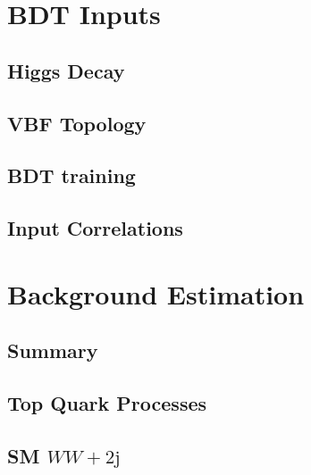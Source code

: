 

\section{BDT Inputs}

\subsection{Higgs Decay}

\subsection{VBF Topology}

\subsection{BDT training}

\subsection{Input Correlations}

\section{Background Estimation}

\subsection{Summary}

%

\subsection{Top Quark Processes}

%

\subsection{SM $WW+2\textrm{j}$}

